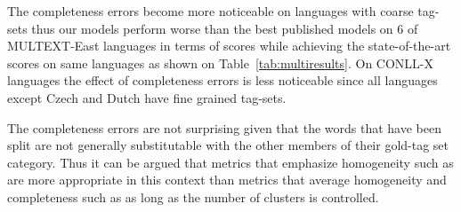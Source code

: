 The completeness errors become more noticeable on languages with
coarse tag-sets thus our models perform worse than the best published
models on 6 of MULTEXT-East languages in terms of \vm scores while
achieving the state-of-the-art \mto scores on same languages as shown
on Table~\ref{tab:multiresults}.  On CONLL-X languages the effect of
completeness errors is less noticeable since all languages except
Czech and Dutch have fine grained tag-sets.

The completeness errors are not surprising given that the words that
have been split are not generally substitutable with the other members
of their gold-tag set category.  Thus it can be argued that metrics
that emphasize homogeneity such as \mto are more appropriate in this
context than metrics that average homogeneity and completeness such as
\vm as long as the number of clusters is controlled.

